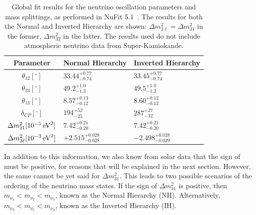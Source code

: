 \begin{table}
    \centering
    \begin{tabular}{c p{2.2cm} p{2.2cm}}
        \hline
        Parameter   & Normal Hierarchy                       & Inverted Hierarchy  \\ \hline \hline
        $\theta_{12} [^{\circ}]$ & $33.44^{+0.77}_{-0.74}$  & $33.45^{+0.77}_{-0.74}$     \\
        $\theta_{23} [^{\circ}]$ & $49.2^{+1.0}_{-1.3}$     & $49.5^{+1.0}_{-1.2}$  \\
        $\theta_{13} [^{\circ}]$ & $8.57^{+0.13}_{-0.12}$   & $8.60^{+0.12}_{-0.12}$  \\
        $\delta_{CP} [^{\circ}]$ & $194^{+52}_{-25}$        & $287^{+27}_{-32}$   \\
        $\dmsq{} [10^{-5}\,\si{eV\squared}]$ & $7.42^{+0.21}_{-0.20}$ & $7.42^{+0.21}_{-0.20}$    \\
        $\Delta m^{2}_{3\ell} [10^{-3}\,\si{eV\squared}]$ & $+2.515^{+0.028}_{-0.028}$ & $-2.498^{+0.028}_{-0.029}$    \\
        \hline
    \end{tabular}
    \caption[Global Fit neutrino oscillation parameters]
    {Global fit results for the neutrino oscillation parameters and mass splittings, as performed in NuFit 5.1~\cite{estebanFateHintsUpdated2020}. The results for both the Normal and Inverted Hierarchy are shown: $\Delta m^{2}_{3\ell} = \Delta m^{2}_{31}$ in the former, $\Delta m^{2}_{32}$ in the latter. The results used do not include atmospheric neutrino data from Super-Kamiokande.}
    \label{tab:nufit_osc_params}
\end{table}

In addition to this information, we also know from solar data that the sign of \dmsq{} must be positive, for reasons that will be explained in the next section. However, the same cannot be yet said for $\Delta m^{2}_{31}$. This leads to two possible scenarios of the ordering of the neutrino mass states. If the sign of $\Delta m^{2}_{31}$ is positive, then $m_{\nu_{1}}<m_{\nu_{2}}<m_{\nu_{3}}$, known as the Normal Hierarchy (NH). Alternatively, $m_{\nu_{3}}<m_{\nu_{1}}<m_{\nu_{2}}$, known as the Inverted Hierarchy (IH).

